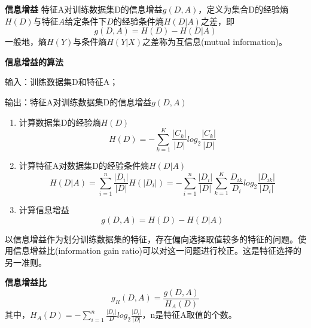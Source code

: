 \textbf{信息增益}
特征A对训练数据集D的信息增益$g(D,A)$，定义为集合D的经验熵$H(D)$与特征$A$给定条件下$D$的经验条件熵$H(D|A)$之差，即
$$g(D,A) = H(D) - H(D|A)$$
一般地，熵$H(Y)$与条件熵$H(Y|X)$之差称为互信息(mutual information)。

\textbf{信息增益的算法}

输入：训练数据集D和特征A；

输出：特征A对训练数据集D的信息增益$g(D,A)$
\begin{enumerate}[(1)]
	\item 计算数据集D的经验熵$H(D)$
	\begin{equation}
		H(D)=-\sum_{k=1}^K\frac{|C_k|}{|D|}log_2\frac{|C_k|}{|D|}
	\end{equation}
	\item 计算特征A对数据集D的经验条件熵$H(D|A)$
	\begin{equation}
		H(D|A)=\sum_{i=1}^n\frac{|D_i|}{|D|}H(|D_i|) = -\sum_{i=1}^n\frac{|D_i|}{|D|}\sum_{k=1}^K\frac{D_{ik}}{D_i}log_2\frac{|D_{ik}|}{|D_i|}
	\end{equation}
	\item 计算信息增益
	\begin{equation}
		g(D,A) = H(D) - H(D|A)
	\end{equation}
\end{enumerate}
以信息增益作为划分训练数据集的特征，存在偏向选择取值较多的特征的问题。使用信息增益比(information gain ratio)可以对这一问题进行校正。这是特征选择的另一准则。

\textbf{信息增益比}
\begin{equation}
	g_R(D,A) = \frac{g(D,A)}{H_A(D)}
\end{equation}
其中，$H_A(D)=-\sum_{i=1}^n\frac{|D_i|}{D}log_2\frac{|D_i|}{|D|}$，n是特征A取值的个数。

